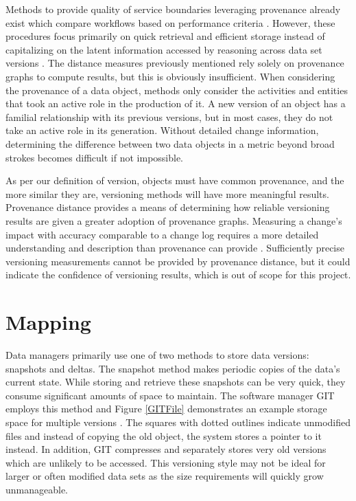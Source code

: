 Methods to provide quality of service boundaries leveraging provenance already exist which compare workflows based on performance criteria \cite{2015:CAA:2778374.2778504}.
However, these procedures focus primarily on quick retrieval and efficient storage instead of capitalizing on the latent information accessed by reasoning across data set versions \cite{tan2004research}.
The distance measures previously mentioned rely solely on provenance graphs to compute results, but this is obviously insufficient.
When considering the provenance of a data object, methods only consider the activities and entities that took an active role in the production of it.
A new version of an object has a familial relationship with its previous versions, but in most cases, they do not take an active role in its generation.
Without detailed change information, determining the difference between two data objects in a metric beyond broad strokes becomes difficult if not impossible.

As per our definition of version, objects must have common provenance, and the more similar they are, versioning methods will have more meaningful results.
Provenance distance provides a means of determining how reliable versioning results are given a greater adoption of provenance graphs.
Measuring a change's impact with accuracy comparable to a change log requires a more detailed understanding and description than provenance can provide  \cite{Bose:2005:LRS:1057977.1057978}.
Sufficiently precise versioning measurements cannot be provided by provenance distance, but it could indicate the confidence of versioning results, which is out of scope for this project.

\section{Mapping}

Data managers primarily use one of two methods to store data versions: snapshots and deltas.
The snapshot method makes periodic copies of the data's current state.
While storing and retrieve these snapshots can be very quick, they consume significant amounts of space to maintain.
The software manager GIT employs this method and Figure \ref{GITFile} demonstrates an example storage space for multiple versions \cite{Chacon:2009:PG:1618548}.
The squares with dotted outlines indicate unmodified files and instead of copying the old object, the system stores a pointer to it instead.
In addition, GIT compresses and separately stores very old versions which are unlikely to be accessed.
This versioning style may not be ideal for larger or often modified data sets as the size requirements will quickly grow unmanageable.

